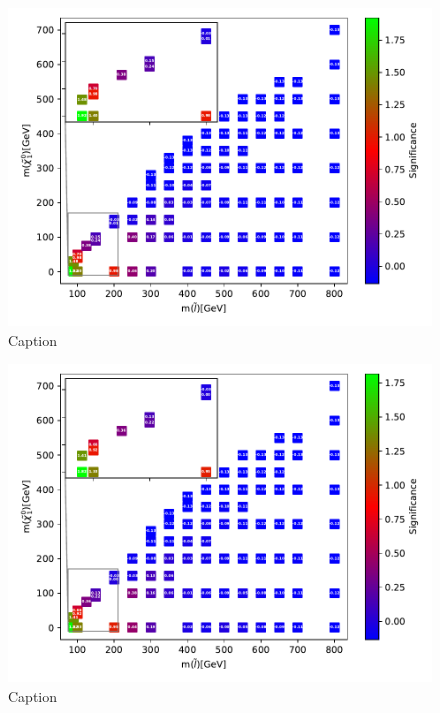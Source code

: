 \begin{figure}
    \centering
    \includegraphics[width = \textwidth]{Figures/Significances/significance_NN_slepslep_All_level.pdf}
    \caption{Caption}
    \label{fig:my_label}
\end{figure}

\begin{figure}
    \centering
    \includegraphics[width = \textwidth]{Figures/Significances/significance_NN_slepslep_Low_level.pdf}
    \caption{Caption}
    \label{fig:my_label}
\end{figure}


